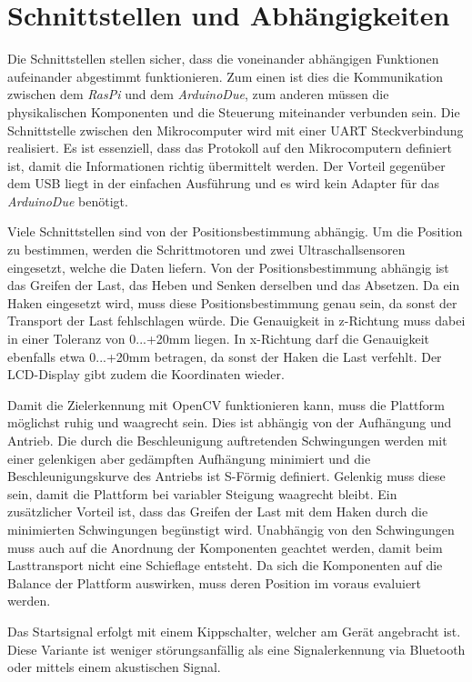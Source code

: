 \documentclass[a4paper]{report}
\begin{document}
\section{Schnittstellen und Abhängigkeiten}
\label{sec:SchnittAbhang}

Die Schnittstellen stellen sicher, dass die voneinander abhängigen Funktionen aufeinander abgestimmt funktionieren. Zum einen ist dies die Kommunikation zwischen dem \textit{RasPi} und dem \textit{ArduinoDue}, zum anderen müssen die physikalischen Komponenten und die Steuerung miteinander verbunden sein. Die Schnittstelle zwischen den Mikrocomputer wird mit einer UART Steckverbindung realisiert. Es ist essenziell, dass das Protokoll auf den Mikrocomputern definiert ist, damit die Informationen richtig übermittelt werden. Der Vorteil gegenüber dem USB liegt in der einfachen Ausführung und es wird kein Adapter für das \textit{ArduinoDue} benötigt.

Viele Schnittstellen sind von der Positionsbestimmung abhängig. Um die Position zu bestimmen, werden die Schrittmotoren und zwei Ultraschallsensoren eingesetzt, welche die Daten liefern. Von der Positionsbestimmung abhängig ist das Greifen der Last, das Heben und Senken derselben und das Absetzen. Da ein Haken eingesetzt wird, muss diese Positionsbestimmung genau sein, da sonst der Transport der Last fehlschlagen würde. Die Genauigkeit in z-Richtung muss dabei in einer Toleranz von 0...+20mm liegen. In x-Richtung darf die Genauigkeit ebenfalls etwa 0...+20mm betragen, da sonst der Haken die Last verfehlt. Der LCD-Display gibt zudem die Koordinaten wieder.

Damit die Zielerkennung mit OpenCV funktionieren kann, muss die Plattform möglichst ruhig und waagrecht sein. Dies ist abhängig von der Aufhängung und Antrieb. Die durch die Beschleunigung auftretenden Schwingungen werden mit einer gelenkigen aber gedämpften Aufhängung minimiert und die Beschleunigungskurve des Antriebs ist S-Förmig definiert. Gelenkig muss diese sein, damit die Plattform bei variabler Steigung waagrecht bleibt. Ein zusätzlicher Vorteil ist, dass das Greifen der Last mit dem Haken durch die minimierten Schwingungen begünstigt wird. Unabhängig von den Schwingungen muss auch auf die Anordnung der Komponenten geachtet werden, damit beim Lasttransport nicht eine Schieflage entsteht. Da sich die Komponenten auf die Balance der Plattform auswirken, muss deren Position im voraus evaluiert werden.

Das Startsignal erfolgt mit einem Kippschalter, welcher am Gerät angebracht ist. Diese Variante ist weniger störungsanfällig als eine Signalerkennung via Bluetooth oder mittels einem akustischen Signal.
\end{document}
